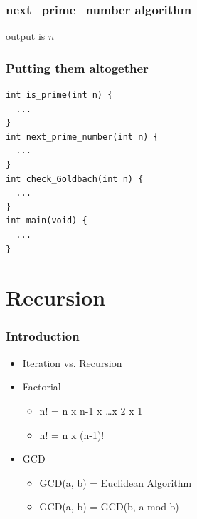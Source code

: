 \documentclass{../c-lecture}
\begin{document}
\begin{frame}[fragile]
  \frametitle{next\_prime\_number algorithm}
  \begin{algorithm}[H]
  output is $n$\;
  \end{algorithm}
\end{frame}

\begin{frame}[fragile]
  \frametitle{Putting them altogether}
  \begin{verbatim}
int is_prime(int n) {
  ...
}
int next_prime_number(int n) {
  ...
}
int check_Goldbach(int n) {
  ...
}
int main(void) {
  ...
}
  \end{verbatim}
\end{frame}

\section{Recursion}

\begin{frame}
  \frametitle{Introduction}
  \begin{itemize}
    \item Iteration vs. Recursion
    \item Factorial
    \begin{itemize}
      \item n! = n x n-1 x \ldots x 2 x 1
      \item n! = n x (n-1)!
    \end{itemize}
    \item GCD
    \begin{itemize}
      \item GCD(a, b) = Euclidean Algorithm
      \item GCD(a, b) = GCD(b, a mod b)
    \end{itemize}
  \end{itemize}
\end{frame}
\end{document}
